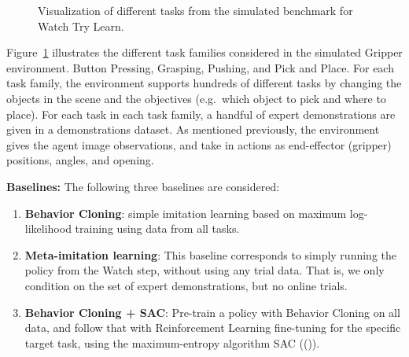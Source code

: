 \documentclass[
  letterpaper,
  numbers=noenddot,
  DIV=11]{scrreprt}
\theoremstyle{definition}
\theoremstyle{plain}
\theoremstyle{plain}
\theoremstyle{remark}
\begin{document}
\begin{figure}


\caption{\label{fig-envs}Visualization of different tasks from the
simulated benchmark for Watch Try Learn.}

\end{figure}%

Figure~\ref{fig-envs} illustrates the different task families considered
in the simulated Gripper environment. Button Pressing, Grasping,
Pushing, and Pick and Place. For each task family, the environment
supports hundreds of different tasks by changing the objects in the
scene and the objectives (e.g.~which object to pick and where to place).
For each task in each task family, a handful of expert demonstrations
are given in a demonstrations dataset. As mentioned previously, the
environment gives the agent image observations, and take in actions as
end-effector (gripper) positions, angles, and opening.

\textbf{Baselines:} The following three baselines are considered:

\begin{enumerate}
\def\labelenumi{\arabic{enumi}.}
\item
  \textbf{Behavior Cloning}: simple imitation learning based on maximum
  log-likelihood training using data from all tasks.
\item
  \textbf{Meta-imitation learning}: This baseline corresponds to simply
  running the policy from the Watch step, without using any trial data.
  That is, we only condition on the set of expert demonstrations, but no
  online trials.
\item
  \textbf{Behavior Cloning + SAC}: Pre-train a policy with Behavior
  Cloning on all data, and follow that with Reinforcement Learning
  fine-tuning for the specific target task, using the maximum-entropy
  algorithm SAC (()).
\end{enumerate}
\end{document}
